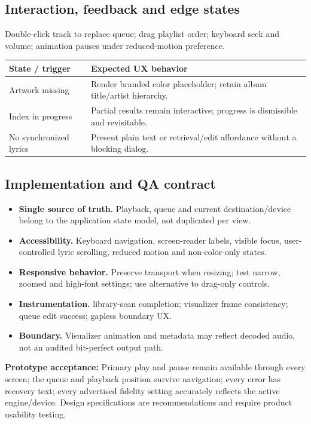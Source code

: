 \documentclass[10pt,a4paper,oneside]{report}
\begin{document}
\subsection*{Interaction, feedback and edge states}
Double-click track to replace queue; drag playlist order; keyboard seek and volume; animation pauses under reduced-motion preference.\par
\begin{tabularx}{\linewidth}{@{}p{39mm}X@{}}\toprule State / trigger & Expected UX behavior\\\midrule
Artwork missing & Render branded color placeholder; retain album title/artist hierarchy.\\
Index in progress & Partial results remain interactive; progress is dismissible and revisitable.\\
No synchronized lyrics & Present plain text or retrieval/edit affordance without a blocking dialog.\\
\bottomrule\end{tabularx}
\subsection*{Implementation and QA contract}
\begin{itemize}[leftmargin=*,itemsep=2pt,topsep=2pt]
\item \textbf{Single source of truth.} Playback, queue and current destination/device belong to the application state model, not duplicated per view.
\item \textbf{Accessibility.} Keyboard navigation, screen-reader labels, visible focus, user-controlled lyric scrolling, reduced motion and non-color-only states.
\item \textbf{Responsive behavior.} Preserve transport when resizing; test narrow, zoomed and high-font settings; use alternative to drag-only controls.
\item \textbf{Instrumentation.} library-scan completion; visualizer frame consistency; queue edit success; gapless boundary UX.
\item \textbf{Boundary.} Visualizer animation and metadata may reflect decoded audio, not an audited bit-perfect output path.
\end{itemize}
\vspace{2mm}\begin{evidencebox}\small\textbf{Prototype acceptance:} Primary play and pause remain available through every screen; the queue and playback position survive navigation; every error has recovery text; every advertised fidelity setting accurately reflects the active engine/device. Design specifications are recommendations and require product usability testing.\end{evidencebox}
\clearpage
\end{document}
